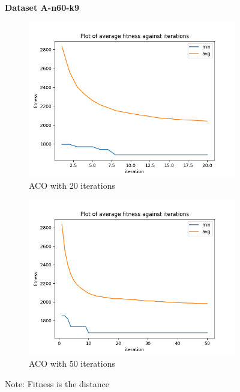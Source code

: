 \documentclass[a4paper]{exam}
\begin{document}
\begin{questions}
  \begin{figure}[H]
    \centering
    \textbf{Dataset A-n60-k9}
    \begin{subfigure}{.5\textwidth}
      \centering
      \includegraphics[width=1\linewidth]{images/n60-k9_20.png}
      \caption{ACO with 20 iterations}
      \label{fig:n60-k9_20}
    \end{subfigure}%
    \begin{subfigure}{.5\textwidth}
      \centering
      \includegraphics[width=1\linewidth]{images/n60-k9_50.png}
      \caption{ACO with 50 iterations}
      \label{fig:n60-k9_50}
    \end{subfigure}
    \caption{Note: Fitness is the distance}
    \label{fig:60-k9}
  \end{figure}


\end{questions}
\end{document}
